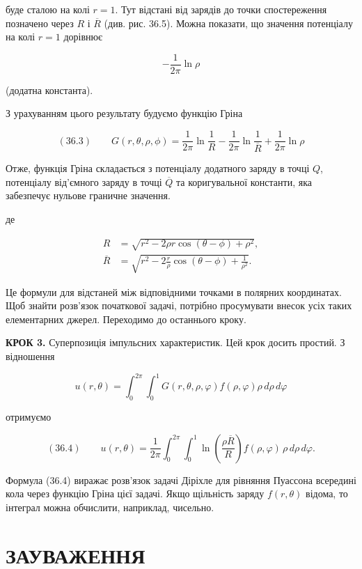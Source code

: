 \documentclass[
  ukrainian,
]{article}
\begin{document}
буде сталою на колі \(r=1\). Тут відстані від зарядів до точки
спостереження позначено через \(R\) і \(\overline{R}\) (див. рис. 36.5).
Можна показати, що значення потенціалу на колі \(r=1\) дорівнює

\[-\frac{1}{2\pi}\ln\rho\]

(додатна константа).

З урахуванням цього результату будуємо функцію Гріна

\[(36.3)\qquad G(r, \theta, \rho, \phi) =\frac{1}{2\pi} \ln \frac{1}{R}- \frac{1}{2\pi} \ln \frac{1}{\overline{R}}+ \frac{1}{2\pi} \ln \rho\]

Отже, функція Гріна складається з потенціалу додатного заряду в точці
\(Q\), потенціалу від'ємного заряду в точці \(\overline{Q}\) та
коригувальної константи, яка забезпечує нульове граничне значення.

де

\[\begin{aligned}R &= \sqrt{r^2 - 2\rho r \cos(\theta - \phi) + \rho^2},\\\overline{R} &= \sqrt{r^2 - 2\frac{r}{\rho}\cos(\theta - \phi) + \frac{1}{\rho^2}}.\end{aligned}\]

Це формули для відстаней між відповідними точками в полярних
координатах. Щоб знайти розв'язок початкової задачі, потрібно
просумувати внесок усіх таких елементарних джерел. Переходимо до
останнього кроку.

\textbf{КРОК 3.} Суперпозиція імпульсних характеристик. Цей крок досить
простий. З відношення

\[u(r, \theta) = \int_{0}^{2\pi} \int_{0}^{1} G(r, \theta, \rho, \varphi) f(\rho, \varphi) \rho\, d\rho\, d\varphi\]

отримуємо

\[(36.4)\qquad u(r, \theta) = \frac{1}{2\pi} \int_{0}^{2\pi} \int_{0}^{1}\ln \left(\frac{\rho \overline{R}}{R}\right) f(\rho, \varphi)\,\rho\, d\rho\, d\varphi.\]

Формула (36.4) виражає розв'язок задачі Діріхле для рівняння Пуассона
всередині кола через функцію Гріна цієї задачі. Якщо щільність заряду
\(f(r, \theta)\) відома, то інтеграл можна обчислити, наприклад,
чисельно.

\section{ЗАУВАЖЕННЯ}\label{ux437ux430ux443ux432ux430ux436ux435ux43dux43dux44f-11}
\end{document}
